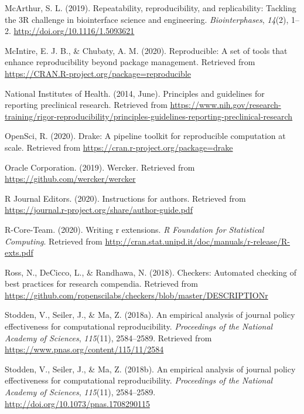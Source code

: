 \documentclass[12pt,twoside]{reedthesis}
\begin{document}
\hypertarget{ref-engineering-reproducibility}{}
McArthur, S. L. (2019). Repeatability, reproducibility, and
replicability: Tackling the 3R challenge in biointerface science and
engineering. \emph{Biointerphases}, \emph{14}(2), 1--2.
\url{http://doi.org/10.1116/1.5093621}

\hypertarget{ref-R-reproducible}{}
McIntire, E. J. B., \& Chubaty, A. M. (2020). Reproducible: A set of
tools that enhance reproducibility beyond package management. Retrieved
from \url{https://CRAN.R-project.org/package=reproducible}

\hypertarget{ref-bio-principles}{}
National Institutes of Health. (2014, June). Principles and guidelines
for reporting preclinical research. Retrieved from
\url{https://www.nih.gov/research-training/rigor-reproducibility/principles-guidelines-reporting-preclinical-research}

\hypertarget{ref-R-drake}{}
OpenSci, R. (2020). Drake: A pipeline toolkit for reproducible
computation at scale. Retrieved from
\url{https://cran.r-project.org/package=drake}

\hypertarget{ref-wercker}{}
Oracle Corporation. (2019). Wercker. Retrieved from
\url{https://github.com/wercker/wercker}

\hypertarget{ref-r-journal}{}
R Journal Editors. (2020). Instructions for authors. Retrieved from
\url{https://journal.r-project.org/share/author-guide.pdf}

\hypertarget{ref-coreteam-extensions}{}
R-Core-Team. (2020). Writing r extensions. \emph{R Foundation for
Statistical Computing}. Retrieved from
\url{http://cran.stat.unipd.it/doc/manuals/r-release/R-exts.pdf}

\hypertarget{ref-R-checkers}{}
Ross, N., DeCicco, L., \& Randhawa, N. (2018). Checkers: Automated
checking of best practices for research compendia. Retrieved from
\url{https://github.com/ropenscilabs/checkers/blob/master/DESCRIPTIONr}

\hypertarget{ref-policy-effectiveness}{}
Stodden, V., Seiler, J., \& Ma, Z. (2018a). An empirical analysis of
journal policy effectiveness for computational reproducibility.
\emph{Proceedings of the National Academy of Sciences}, \emph{115}(11),
2584--2589. Retrieved from
\url{https://www.pnas.org/content/115/11/2584}

\hypertarget{ref-Stodden2584}{}
Stodden, V., Seiler, J., \& Ma, Z. (2018b). An empirical analysis of
journal policy effectiveness for computational reproducibility.
\emph{Proceedings of the National Academy of Sciences}, \emph{115}(11),
2584--2589. \url{http://doi.org/10.1073/pnas.1708290115}
\end{document}
